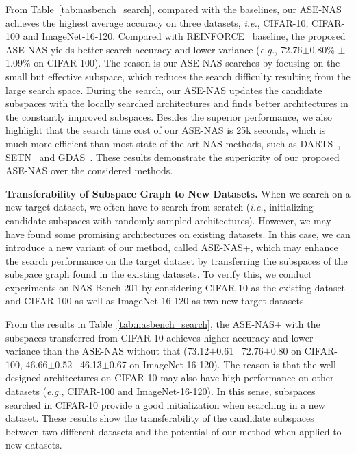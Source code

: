 \documentclass[lettersize,journal]{IEEEtran}
\newcommand{\sexyname}{ASE-NAS\xspace}
\newcommand{\sexynameplus}{ASE-NAS+\xspace}
\def\eg{\emph{e.g.}} \def\Eg{\emph{E.g.}}
\def\ie{\emph{i.e.}} \def\Ie{\emph{I.e.}}
\begin{document}
From Table~\ref{tab:nasbench_search}, compared with the baselines, our \sexyname achieves the highest average accuracy on three datasets, \ie, CIFAR-10, CIFAR-100 and ImageNet-16-120.
Compared with REINFORCE~\cite{williams1992simple} baseline, the proposed \sexyname yields better search accuracy and lower variance (\eg, 72.76$\pm$0.80\% $\pm$1.09\% on CIFAR-100).
The reason is our \sexyname searches by focusing on the small but effective subspace, which reduces the search difficulty resulting from the large search space.
During the search, our \sexyname updates the candidate subspaces with the locally searched architectures and finds better architectures in the constantly improved subspaces.
Besides the superior performance, we also highlight that the search time cost of our \sexyname is 25k seconds, which is much more efficient than most state-of-the-art NAS methods, such as DARTS~\cite{liu2018darts}, SETN~\cite{dong2019oneshot} and GDAS~\cite{dong2019searching}.
These results demonstrate the superiority of our proposed \sexyname over the considered methods.

\textbf{Transferability of Subspace Graph to New Datasets.}
When we search on a new target dataset, we often have to search from scratch (\ie, initializing candidate subspaces with randomly sampled architectures).
However, we may have found some promising architectures on existing datasets.
In this case, we can introduce a new variant of our method, called \sexynameplus, which may enhance the search performance on the target dataset by transferring the subspaces of the subspace graph found in the existing datasets.
To verify this, we conduct experiments on NAS-Bench-201 by considering CIFAR-10 as the existing dataset and CIFAR-100 as well as ImageNet-16-120 as two new target datasets.

From the results in Table~\ref{tab:nasbench_search}, the \sexynameplus with the subspaces transferred from CIFAR-10 achieves higher accuracy and lower variance than the \sexyname without that (73.12{$\pm$0.61} \vs~72.76{$\pm$0.80} on CIFAR-100, 46.66{$\pm$0.52} \vs~46.13{$\pm$0.67} on ImageNet-16-120).
The reason is that the well-designed architectures on CIFAR-10 may also have high performance on other datasets (\eg, CIFAR-100 and ImageNet-16-120).
In this sense, subspaces searched in CIFAR-10 provide a good initialization when searching in a new dataset.
These results show the transferability of the candidate subspaces between two different datasets and the potential of our method when applied to new datasets.
\end{document}
